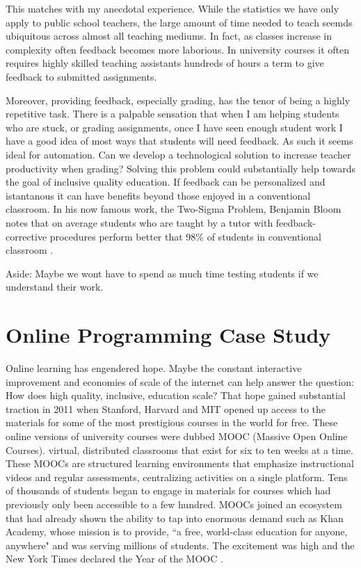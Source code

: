 This matches with my anecdotal experience. While the statistics we have only apply to public school teachers, the large amount of time needed to teach seemds ubiquitous across almost all teaching mediums. In fact, as classes increase in complexity often feedback becomes more laborious. In university courses it often requires highly skilled teaching assistants hundreds of hours a term to give feedback to submitted assignments.

Moreover, providing feedback, especially grading, has the tenor of being a highly repetitive task. There is a palpable sensation that when I am helping students who are stuck, or grading assignments, once I have seen enough student work I have a good idea of most ways that students will need feedback. As such it seems ideal for automation. Can we develop a technological solution to increase teacher productivity when grading? Solving this problem could substantially help towards the goal of inclusive quality education. If feedback can be personalized and istantanous it can have benefits beyond those enjoyed in a conventional classroom. In his now famous work, the Two-Sigma Problem, Benjamin Bloom notes that on average students who are taught by a tutor with feedback-corrective procedures perform better that 98\% of students in conventional classroom \cite{corbett2001cognitive}.

Aside: Maybe we wont have to spend as much time testing students if we understand their work.  

\section{Online Programming Case Study}

Online learning has engendered hope. Maybe the constant interactive improvement and economies of scale of the internet can help answer the question: How does high quality, inclusive, education scale? 
That hope gained substantial traction in 2011 when Stanford, Harvard and MIT opened up access to the materials for some of the most prestigious courses in the world for free. These online versions of university courses were dubbed MOOC (Massive Open Online Courses).  virtual, distributed classrooms that
exist for six to ten weeks at a time. These MOOCs are
structured learning environments that emphasize instructional
videos and regular assessments, centralizing activities
on a single platform. Tens of thousands of students began to engage in materials for courses which had previously only been accessible to a few hundred. MOOCs joined an ecosystem that had already shown the ability to tap into enormous demand such as Khan Academy, whose mission is to provide, ``a free, world-class education for anyone, anywhere" and was serving millions of students. The excitement was high and the New York Times declared the Year of the MOOC \cite{}. 

